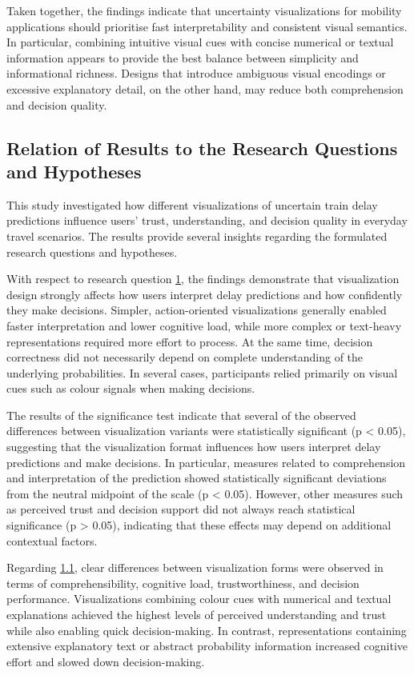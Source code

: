 \documentclass[final,journal,a4paper]{IEEEtran}
\begin{document}
Taken together, the findings indicate that uncertainty visualizations for mobility applications should prioritise fast interpretability and consistent visual semantics. In particular, combining intuitive visual cues with concise numerical or textual information appears to provide the best balance between simplicity and informational richness. Designs that introduce ambiguous visual encodings or excessive explanatory detail, on the other hand, may reduce both comprehension and decision quality.

\subsection{Relation of Results to the Research Questions and Hypotheses}
This study investigated how different visualizations of uncertain train delay predictions influence users’ trust, understanding, and decision quality in everyday travel scenarios. The results provide several insights regarding the formulated research questions and hypotheses.

With respect to research question \hyperlink{rq:1}{1}, the findings demonstrate that visualization design strongly affects how users interpret delay predictions and how confidently they make decisions. Simpler, action-oriented visualizations generally enabled faster interpretation and lower cognitive load, while more complex or text-heavy representations required more effort to process. At the same time, decision correctness did not necessarily depend on complete understanding of the underlying probabilities. In several cases, participants relied primarily on visual cues such as colour signals when making decisions.

The results of the significance test indicate that several of the observed differences between visualization variants were statistically significant (p < 0.05), suggesting that the visualization format influences how users interpret delay predictions and make decisions. In particular, measures related to comprehension and interpretation of the prediction showed statistically significant deviations from the neutral midpoint of the scale (p < 0.05). However, other measures such as perceived trust and decision support did not always reach statistical significance (p > 0.05), indicating that these effects may depend on additional contextual factors.

Regarding \hyperlink{rq:1.1}{1.1}, clear differences between visualization forms were observed in terms of comprehensibility, cognitive load, trustworthiness, and decision performance. Visualizations combining colour cues with numerical and textual explanations achieved the highest levels of perceived understanding and trust while also enabling quick decision-making. In contrast, representations containing extensive explanatory text or abstract probability information increased cognitive effort and slowed down decision-making.
\end{document}

